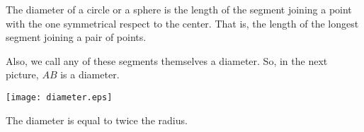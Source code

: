 \documentclass[12pt]{article}
\begin{document}
The diameter of a circle or a sphere is the length of the segment joining a point with the one symmetrical respect to the center. That is, the length of the longest segment joining a pair of points.

Also, we call any of these segments themselves a diameter. So, in the next picture, $AB$ is a diameter.

\begin{center}
\texttt{[image: diameter.eps]}
\end{center}

The diameter is equal to twice the radius.
\end{document}
